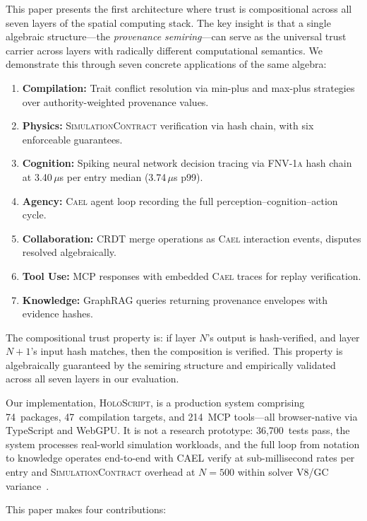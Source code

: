 \documentclass[sigchi-a]{acmart}
\newcommand{\holoscript}{\textsc{HoloScript}}
\newcommand{\cael}{\textsc{Cael}}
\newcommand{\fnvhash}{\textsc{FNV-1a}}
\newcommand{\simcontract}{\textsc{SimulationContract}}
\begin{document}
This paper presents the first architecture where trust is compositional
across all seven layers of the spatial computing stack. The key insight is
that a single algebraic structure---the \emph{provenance semiring}---can
serve as the universal trust carrier across layers with radically different
computational semantics. We demonstrate this through seven concrete
applications of the same algebra:

\begin{enumerate}
  \item \textbf{Compilation:} Trait conflict resolution via min-plus and
    max-plus strategies over authority-weighted provenance values.
  \item \textbf{Physics:} \simcontract{} verification via hash chain,
    with six enforceable guarantees.
  \item \textbf{Cognition:} Spiking neural network decision tracing via
    \fnvhash{} hash chain at 3.40\,$\mu$s per entry median (3.74\,$\mu$s p99).
  \item \textbf{Agency:} \cael{} agent loop recording the full
    perception--cognition--action cycle.
  \item \textbf{Collaboration:} CRDT merge operations as \cael{} interaction
    events, disputes resolved algebraically.
  \item \textbf{Tool Use:} MCP responses with embedded \cael{} traces for
    replay verification.
  \item \textbf{Knowledge:} GraphRAG queries returning provenance envelopes
    with evidence hashes.
\end{enumerate}

The compositional trust property is: if layer $N$'s output is hash-verified,
and layer $N{+}1$'s input hash matches, then the composition is verified. This
property is algebraically guaranteed by the semiring structure and empirically
validated across all seven layers in our evaluation.

Our implementation, \holoscript{}, is a production system comprising
74~packages, 47~compilation targets, and 214~MCP tools---all browser-native
via TypeScript and WebGPU. It is not a research prototype: 36,700~tests pass,
the system processes real-world simulation workloads, and the full loop from
notation to knowledge operates end-to-end with CAEL verify at sub-millisecond
rates per entry and \simcontract{} overhead at $N{=}500$ within solver V8/GC
variance~\cite{mcp-trust-paper}.

This paper makes four contributions:
\end{document}
